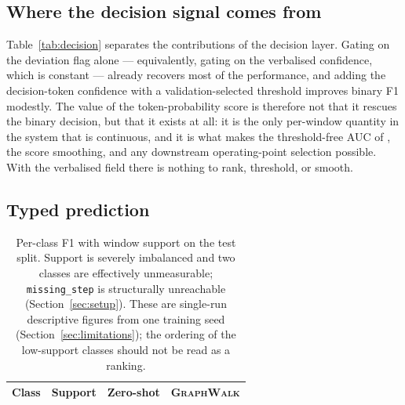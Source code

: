 \documentclass[10pt,twocolumn]{article}
\newcommand{\ourmodel}{\textsc{GraphWalk}}
\begin{document}
\subsection{Where the decision signal comes from}

\begin{table}[t]
\centering\small
\setlength{\tabcolsep}{4pt}
\caption{Decision-layer ablation for \ourmodel{}, all recomputed on CPU from the
same saved predictions. The first row gates on the model's deviation flag alone,
which is what gating on the verbalised confidence reduces to, since that field is
a constant after fine-tuning.}
\label{tab:decision}
\end{table}

Table~\ref{tab:decision} separates the contributions of the decision layer.
Gating on the deviation flag alone --- equivalently, gating on the verbalised
confidence, which is constant --- already recovers most of the performance, and
adding the decision-token confidence with a validation-selected threshold
improves binary F1 modestly. The value of the token-probability score is
therefore not that it rescues the binary decision, but that it exists at all: it
is the only per-window quantity in the system that is continuous, and it is what
makes the threshold-free AUC of \resAUC{}, the score smoothing, and any
downstream operating-point selection possible. With the verbalised field there is
nothing to rank, threshold, or smooth.

\subsection{Typed prediction}

\begin{table}[t]
\centering\small
\begin{tabular}{lrcc}
\toprule
Class & Support & Zero-shot & \ourmodel{}\\
\midrule

\end{tabular}
\caption{Per-class F1 with window support on the test split. Support is severely
imbalanced and two classes are effectively unmeasurable;
\texttt{missing\_step} is structurally unreachable (Section~\ref{sec:setup}).
These are single-run descriptive figures from one training seed
(Section~\ref{sec:limitations}); the ordering of the low-support classes should
not be read as a ranking.}
\label{tab:perclass}
\end{table}
\end{document}
